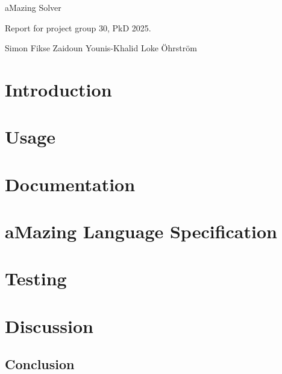 \documentclass[12pt, a4paper]{article}
\begin{document}
\begin{titlepage}
    \vspace*{\fill}
    \begin{center}

        \begin{LARGE}
            aMazing Solver
        \end{LARGE}

        \vspace{5mm}

        \begin{large}
            Report for project group 30, PkD 2025.
        \end{large}

        \vspace{5mm}

        Simon Fikse \quad Zaidoun Younis-Khalid \quad Loke Öhrström

    \end{center}
    \vspace*{\fill}
\end{titlepage}

\newpage
\tableofcontents
\newpage

\section{Introduction}


\section{Usage}

\newpage

\section{Documentation}

\newpage

\section{aMazing Language Specification}

\newpage

\section{Testing}

\newpage

\section{Discussion}

\subsection{Conclusion}

\newpage



\end{document}
